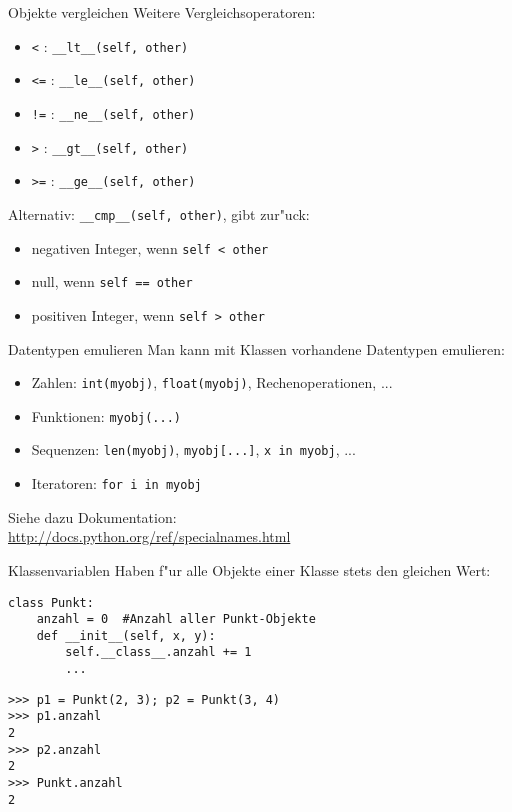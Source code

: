 \begin{frame}[fragile]{Objekte vergleichen}
Weitere Vergleichsoperatoren:
\begin{itemize}
\item \texttt{<} : \lstinline{__lt__(self, other)}
\item \texttt{<=} : \lstinline{__le__(self, other)}
\item \texttt{!=} : \lstinline{__ne__(self, other)}
\item \texttt{>} : \lstinline{__gt__(self, other)}
\item \texttt{>=} : \lstinline{__ge__(self, other)}
\end{itemize}
\vspace{2mm}
Alternativ: \lstinline{__cmp__(self, other)}, gibt zur"uck:
\begin{itemize}
\item negativen Integer, wenn \lstinline{self < other}
\item null, wenn \lstinline{self == other}
\item positiven Integer, wenn \lstinline{self > other}
\end{itemize}
\end{frame}

\begin{frame}{Datentypen emulieren}
Man kann mit Klassen vorhandene Datentypen emulieren:
\begin{itemize}
\item Zahlen: \texttt{int(myobj)}, \texttt{float(myobj)}, Rechenoperationen, ...
\item Funktionen: \texttt{myobj(...)}
\item Sequenzen: \texttt{len(myobj)}, \texttt{myobj[...]}, \lstinline{x in myobj}, ...
\item Iteratoren: \lstinline{for i in myobj}
\end{itemize}
\vspace{2mm}
Siehe dazu Dokumentation:\\
\href{http://docs.python.org/ref/specialnames.html}{http://docs.python.org/ref/specialnames.html}
\end{frame}

\begin{frame}[fragile]{Klassenvariablen}
Haben f"ur alle Objekte einer Klasse stets den gleichen Wert:
\begin{lstlisting}[style=Python]
class Punkt:
    anzahl = 0  #Anzahl aller Punkt-Objekte
    def __init__(self, x, y):
        self.__class__.anzahl += 1
        ...
\end{lstlisting}
\begin{lstlisting}[style=Shell]
>>> p1 = Punkt(2, 3); p2 = Punkt(3, 4)
>>> p1.anzahl
2
>>> p2.anzahl
2
>>> Punkt.anzahl
2
\end{lstlisting}
\end{frame}

